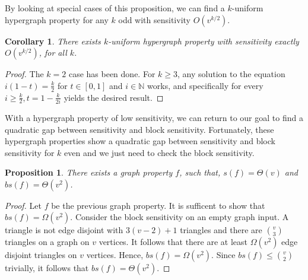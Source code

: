 \documentclass[psamsfonts]{amsart}
\newtheorem{cor}[theorem]{Corollary}
\newtheorem{prop}[theorem]{Proposition}
\theoremstyle{definition}
\theoremstyle{remark}
\numberwithin{equation}{section}
\begin{document}
	By looking at special cases of this proposition, we can find a $k$-uniform hypergraph property for any $k$ odd with sensitivity $O(v^{k/2})$.
	\begin{cor}
		There exists $k$-uniform hypergraph property with sensitivity exactly $O(v^{k/2})$, for all $k$.
	\end{cor}
	\begin{proof}
		The $k=2$ case has been done. For $k\geq 3$, any solution to the equation $i(1-t)=\frac{k}{2}$ for $t\in[0,1]$ and $i\in\mathbb{N}$ works, and specifically for every $i\geq\frac{k}{2}, t=1-\frac{k}{2i}$ yields the desired result.
	\end{proof}
	With a hypergraph property of low sensitivity, we can return to our goal to find a quadratic gap between sensitivity and block sensitivity. Fortunately, these hypergraph properties show a quadratic gap between sensitivity and block sensitivity for $k$ even and we just need to check the block sensitivity.\\
	
	\begin{prop}
		There exists a graph property $f$, such that, $s(f) = \Theta(v)$ and $bs(f) = \Theta(v^2)$.
	\end{prop} 
	\begin{proof}
		Let $f$ be the previous graph property. It is sufficent to show that $bs(f)=\Omega(v^2)$. Consider the block sensitivity on an empty graph input. A triangle is not edge disjoint with $3(v-2)+1$ triangles and there are ${v \choose 3}$ triangles on a graph on $v$ vertices. It follows that there are at least $\Omega(v^2)$ edge disjoint triangles on $v$ vertices. Hence, $bs(f) = \Omega(v^2)$. Since $bs(f) \leq {v \choose 2}$ trivially, it follows that $bs(f) = \Theta(v^2)$.
	\end{proof}
\end{document}
